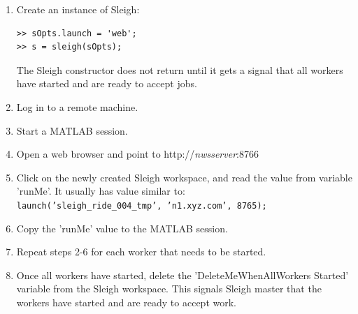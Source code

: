 \begin{enumerate}
\item Create an instance of Sleigh:
\begin{samepage}
\begin{verbatim}
>> sOpts.launch = 'web';
>> s = sleigh(sOpts);
\end{verbatim}
\end{samepage}
The Sleigh constructor does not return until it gets a signal that all
workers have started and are ready to accept jobs.
\item Log in to a remote machine.
\item Start a MATLAB session.
\item Open a web browser and point to http://\textit{nwsserver}:8766
\item Click on the newly created Sleigh workspace, and read the value
from variable 'runMe'. It usually has value similar to:\\
\texttt{launch('sleigh\_ride\_004\_tmp', 'n1.xyz.com', 8765);}
\item Copy the 'runMe' value to the MATLAB session. 
\item Repeat steps 2-6 for each worker that needs to be started.
\item Once all workers have started, delete the 'DeleteMeWhenAllWorkers
Started' variable from the Sleigh workspace. This signals
Sleigh master that the workers have started and are ready to accept work. 
\end{enumerate}
